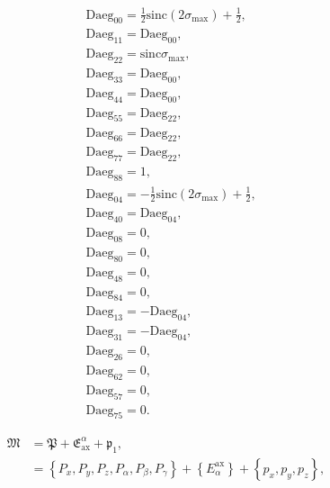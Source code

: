\documentclass[a4paper,11pt,twoside,openright]{book}
\providecommand{\sinc}{{\mathrm{sinc}}}%
\def\lthtmlcheckvsize{\ifdim\ht\sizebox<\vsize 
  \ifdim\wd\sizebox<\hsize\expandafter\hfill\fi \expandafter\vfill
  \else\expandafter\vss\fi}%
\begin{document}
{\newpage\clearpage
\setcounter{equation}{14}
%
\begin{subequations}\begin{align}
&\textrm{Daeg}_{00} = \tfrac{1}{2}\sinc (2\sigma_{\textrm{max}}) + \tfrac{1}{2}, \\
&\textrm{Daeg}_{11} = \textrm{Daeg}_{00} , \\
&\textrm{Daeg}_{22} = \sinc \sigma_{\textrm{max}}, \\
&\textrm{Daeg}_{33} = \textrm{Daeg}_{00} , \\
&\textrm{Daeg}_{44} = \textrm{Daeg}_{00} , \\
&\textrm{Daeg}_{55} = \textrm{Daeg}_{22} , \\
&\textrm{Daeg}_{66} = \textrm{Daeg}_{22} , \\
&\textrm{Daeg}_{77} = \textrm{Daeg}_{22} , \\
&\textrm{Daeg}_{88} = 1 , \\
&\textrm{Daeg}_{04} = -\tfrac{1}{2}\sinc (2\sigma_{\textrm{max}}) + \tfrac{1}{2}, \\
&\textrm{Daeg}_{40} = \textrm{Daeg}_{04} , \\
&\textrm{Daeg}_{08} = 0 , \\
&\textrm{Daeg}_{80} = 0 , \\
&\textrm{Daeg}_{48} = 0 , \\
&\textrm{Daeg}_{84} = 0 , \\
&\textrm{Daeg}_{13} = -\textrm{Daeg}_{04} , \\
&\textrm{Daeg}_{31} = -\textrm{Daeg}_{04} , \\
&\textrm{Daeg}_{26} = 0 , \\
&\textrm{Daeg}_{62} = 0 , \\
&\textrm{Daeg}_{57} = 0 , \\
&\textrm{Daeg}_{75} = 0 .
\end{align}\end{subequations}%
\lthtmldisplayZ
\lthtmlcheckvsize\clearpage}

{\newpage\clearpage
\setcounter{equation}{15}
%
\begin{subequations}\begin{align}
\mathfrak{M}&= \mathfrak{P}+ \mathfrak{E}^\alpha_{\textrm{ax}}+ \mathfrak{p}_1, \\
&= \left\{ P_x, P_y, P_z, P_\alpha , P_\beta , P_\gamma \right\}+ \left\{ E_\alpha^{\textrm{ax}}\right\}+ \left\{ p_x, p_y, p_z\right\},
\end{align}\end{subequations}%
\lthtmldisplayZ
\lthtmlcheckvsize\clearpage}
\end{document}
